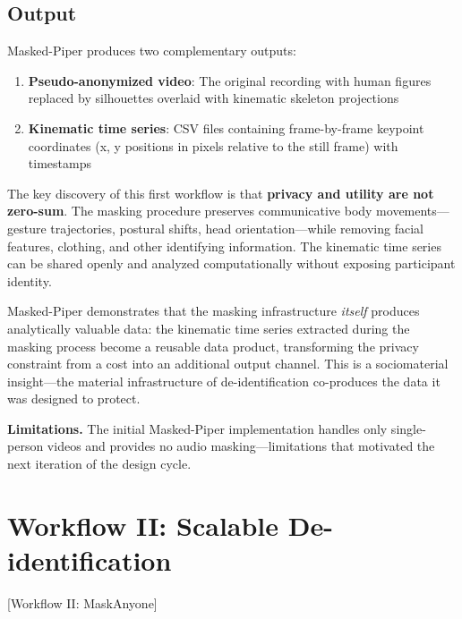 \documentclass[../main.tex]{subfiles}
\begin{document}
\subsection{Output}

Masked-Piper produces two complementary outputs:

\begin{enumerate}
    \item \textbf{Pseudo-anonymized video}: The original recording with human figures replaced by silhouettes overlaid with kinematic skeleton projections
    \item \textbf{Kinematic time series}: CSV files containing frame-by-frame keypoint coordinates (x, y positions in pixels relative to the still frame) with timestamps
\end{enumerate}

The key discovery of this first workflow is that \textbf{privacy and utility are not zero-sum}. The masking procedure preserves communicative body movements---gesture trajectories, postural shifts, head orientation---while removing facial features, clothing, and other identifying information. The kinematic time series can be shared openly and analyzed computationally without exposing participant identity.

\begin{insightbox}
Masked-Piper demonstrates that the masking infrastructure \textit{itself} produces analytically valuable data: the kinematic time series extracted during the masking process become a reusable data product, transforming the privacy constraint from a cost into an additional output channel. This is a sociomaterial insight---the material infrastructure of de-identification co-produces the data it was designed to protect.
\end{insightbox}

\textbf{Limitations.} The initial Masked-Piper implementation handles only single-person videos and provides no audio masking---limitations that motivated the next iteration of the design cycle.


\section{Workflow II: Scalable De-identification}[Workflow II: MaskAnyone]
\end{document}
